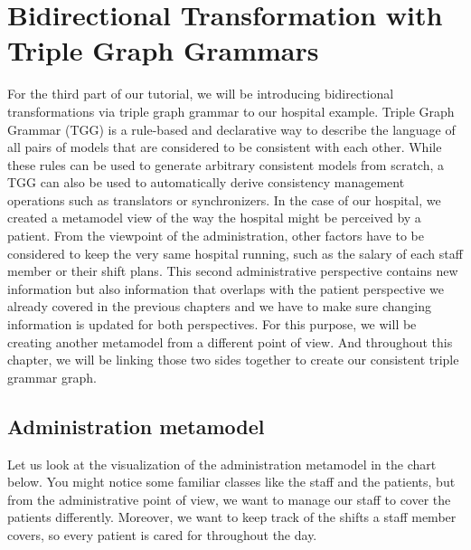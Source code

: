 \section{Bidirectional Transformation with Triple Graph Grammars}

For the third part of our tutorial, we will be introducing bidirectional transformations via triple graph grammar to our hospital example. Triple Graph Grammar (TGG) is a rule-based and declarative way to describe the language of all pairs of models that are considered to be consistent with each other. While these rules can be used to generate arbitrary consistent models from scratch, a TGG can also be used to automatically derive consistency management operations such as translators or synchronizers. In the case of our hospital, we created a metamodel view of the way the hospital might be perceived by a patient. From the viewpoint of the administration, other factors have to be considered to keep the very same hospital running, such as the salary of each staff member or their shift plans. This second administrative perspective contains new information but also information that overlaps with the patient perspective we already covered in the previous chapters and we have to make sure changing information is updated for both perspectives. For this purpose, we will be creating another metamodel from a different point of view. And throughout this chapter, we will be linking those two sides together to create our consistent triple grammar graph.

\subsection{Administration metamodel}

Let us look at the visualization of the administration metamodel in the chart below. You might notice some familiar classes like the staff and the patients, but from the administrative point of view, we want to manage our staff to cover the patients differently. Moreover, we want to keep track of the shifts a staff member covers, so every patient is cared for throughout the day.\newline 

